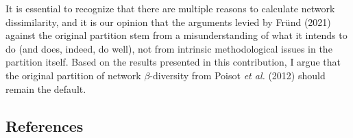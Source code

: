 \documentclass[11pt]{article}
\begin{document}
It is essential to recognize that there are multiple reasons to
calculate network dissimilarity, and it is our opinion that the
arguments levied by Fründ (2021) against the original partition stem
from a misunderstanding of what it intends to do (and does, indeed, do
well), not from intrinsic methodological issues in the partition itself.
Based on the results presented in this contribution, I argue that the
original partition of network \(\beta\)-diversity from Poisot \emph{et
al.} (2012) should remain the default.

\hypertarget{references}{%
\subsection*{References}\label{references}}
\end{document}
